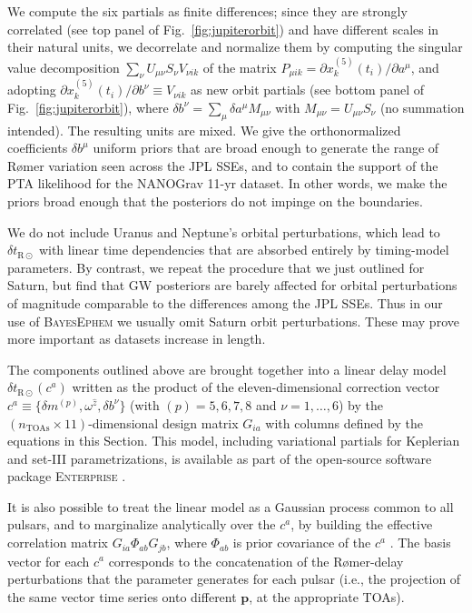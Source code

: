 \documentclass{aastex63}
\begin{document}
\begin{itemize}
We compute the six partials as finite differences; since they are strongly correlated (see top panel of Fig.\ \ref{fig:jupiterorbit}) and have different scales in their natural units, we decorrelate and normalize them by computing the singular value decomposition $\sum_\nu U_{\mu\nu} S_\nu V_{\nu i k}$ of the matrix $P_{\mu i k} = \partial x^{(5)}_k(t_i)/\partial a^\mu$, and adopting $\partial x^{(5)}_k(t_i)/\partial b^\nu \equiv V_{\nu i k}$ as new orbit partials (see bottom panel of Fig.\ \ref{fig:jupiterorbit}), where $\delta b^\nu = \sum_\mu \delta a^\mu M_{\mu \nu}$ with $M_{\mu \nu} = U_{\mu\nu} S_\nu$ (no summation intended). The resulting units are mixed. We give the orthonormalized coefficients $\delta b^\mu$ uniform priors that are broad enough to generate the range of R{\o}mer variation seen across the JPL SSEs, and to contain the support of the PTA likelihood for the NANOGrav 11-yr dataset. In other words, we make the priors broad enough that the posteriors do not impinge on the boundaries.

We do not include Uranus and Neptune's orbital perturbations, which lead to $\delta t_{\mathrm{R\odot}}$ with linear time dependencies that are absorbed entirely by timing-model parameters. By contrast, we repeat the procedure that we just outlined for Saturn, but find that GW posteriors are barely affected for orbital perturbations of magnitude comparable to the differences among the JPL SSEs. Thus in our use of \textsc{BayesEphem} we usually omit Saturn orbit perturbations. These may prove more important as datasets increase in length.
\end{itemize}

The components outlined above are brought together into a linear delay model $\delta t_{\mathrm{R}\odot}(c^a)$ written as the product of the eleven-dimensional correction vector $c^a \equiv \{\delta m^{(p)}, \omega^{\hat{z}}, \delta b^\nu\}$ (with $(p) = 5,6,7,8$ and $\nu = 1, \ldots, 6$) by the $(n_\mathrm{TOAs} \times 11)$-dimensional design matrix $G_{i a}$ with columns defined by the equations in this Section. This model, including variational partials for Keplerian and set-III parametrizations, is available as part of the open-source software package \textsc{Enterprise} \citep{2019ascl.soft12015E}.

It is also possible to treat the linear model as a Gaussian process common to all pulsars, and to marginalize analytically over the $c^a$, by building the effective correlation matrix $G_{i a} \Phi_{ab} G_{j b}$, where $\Phi_{ab}$ is prior covariance of the $c^a$ \citep{vhv14}. The basis vector for each $c^a$ corresponds to the concatenation of the R{\o}mer-delay perturbations that the parameter generates for each pulsar (i.e., the projection of the same vector time series onto different $\mathbf{p}$, at the appropriate TOAs).
\end{document}

